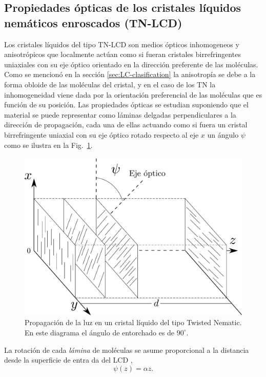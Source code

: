 \subsection{Propiedades ópticas de los cristales líquidos nemáticos enroscados (TN-LCD)}
\label{sec:Propiedades_opticas_de_TNLCD}
Los cristales líquidos del tipo TN-LCD son medios ópticos inhomogeneos
y anisotrópicos que localmente actúan como si fueran cristales
birrefringentes uniaxiales con su eje óptico orientado en la dirección
preferente de las moléculas. Como se mencionó en la sección
\ref{sec:LC-clasification} la anisotropía se debe a la forma obloide
de las moléculas del cristal, y en el caso de los TN la inhomogeneidad
viene dada por la orientación preferencial de las moléculas que es
función de su posición. Las propiedades ópticas se estudian suponiendo
que el material se puede representar como láminas delgadas perpendiculares a la
dirección de propagación, cada una de ellas actuando como si fuera un
cristal birrefringente uniaxial con su eje óptico rotado respecto al eje $x$ un ángulo
$\psi$ como se ilustra en la Fig.~\ref{fig:tn-lcd_sticks}.  
\begin{figure}[h!]
\centering
\includegraphics[scale = .3]{TN-LCD_sticks}
\caption[Propagación de la luz en un TN-LC]{Propagación de la luz en
  un cristal líquido del tipo Twisted 
  Nematic. En este diagrama el ángulo de entorchado es de $90^{\circ}$.}
\label{fig:tn-lcd_sticks}
\end{figure}
La rotación de cada \textit{lámina} de
moléculas se asume proporcional a la distancia desde la superficie de
entra da del LCD ,
\begin{equation}
  \label{eq:twist_angle}
\psi(z)  =\alpha z.  
\end{equation}
